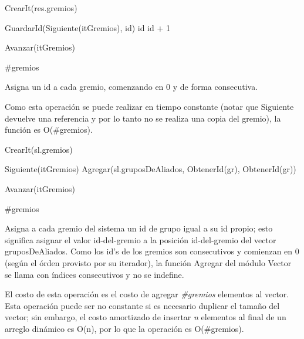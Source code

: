{
	\state {} 											
	\state

	\state {} \asig CrearIt(res.gremios)		
		\state
		
		\state GuardarId(Siguiente(itGremios), id)							
		\state id \asig id + 1												
		
		\state
		\state Avanzar(itGremios)											
	\endwhile
}
{ \#gremios }
{ Asigna un id a cada gremio, comenzando en 0 y de forma consecutiva.

\hspace{10pt} Como esta operación se puede realizar en tiempo constante (notar que Siguiente devuelve una referencia y por lo tanto no se realiza una copia del gremio), la función es O(\#gremios). }

{
	\state {} \asig CrearIt(sl.gremios)		
											
		\state
		
		\state {} \asig Siguiente(itGremios)							
		\state Agregar(sl.gruposDeAliados, ObtenerId(gr), ObtenerId(gr))	

		\state
		\state Avanzar(itGremios)											
	\endwhile
}
{ \#gremios }
{ Asigna a cada gremio del sistema un id de grupo igual a su id propio; esto significa asignar el valor id-del-gremio a la posición id-del-gremio del vector gruposDeAliados. Como los id's de los gremios son consecutivos y comienzan en 0 (según el órden provisto por su iterador), la función Agregar del módulo Vector se llama con índices consecutivos y no se indefine.

\hspace{10pt} El costo de esta operación es el costo de agregar \emph{\#gremios} elementos al vector. Esta operación puede ser no constante si es necesario duplicar el tamaño del vector; sin embargo, el costo amortizado de insertar \emph{n} elementos al final de un arreglo dinámico es O(n), por lo que la operación es O(\#gremios). }

